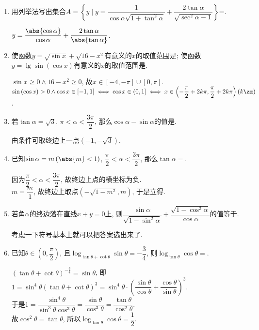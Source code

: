 \begin{enumerate}
\item 用列举法写出集合$A=\left\{y\mid y=\dfrac{1}{\cos\alpha\sqrt{1+\tan^2\alpha}}
+\dfrac{2\tan\alpha}{\sqrt{\sec^2\alpha-1}}\right\}$=.
\begin{jieda}
$y=\dfrac{\abs{\cos\alpha}}{\cos\alpha}+\dfrac{2\tan\alpha}{\abs{\tan\alpha}}$. 
\end{jieda}


\item 使函数$y=\sqrt{\sin{x}}+\sqrt{16-x^2}$有意义的$x$的取值范围是\blkda[3]{$[-4,-\pi]\cup[0,\pi]$}; 
使函数$y=\lg\sin\left(\cos{x}\right)$有意义的$x$的取值范围是. 
\begin{jieda}
$\sin{x}\geq 0\land 16-x^2\geq 0$, 故$x\in[-4,-\pi]\cup[0,\pi]$. \\
$\sin\left(\cos{x}\right)>0\land\cos{x}\in[-1,1]\iff\cos{x}\in\left(0,1\right]\iff x\in\left(-\dfrac{\pi}{2}+2k\pi,\dfrac{\pi}{2}+2k\pi\right)\left(k\zz\right)$. 
\end{jieda}


\item 若$\tan\alpha=\sqrt3$, $\pi<\alpha<\dfrac{3\pi}{2}$, 那么$\cos\alpha-\sin\alpha$的值是.
\begin{jieda}
由条件可取终边上一点$\left(-1,-\sqrt{3}\right)$. 
\end{jieda}


\item 已知$\sin\alpha=m\left(\abs{m}<1\right)$, $\dfrac{\pi}{2}<\alpha<\dfrac{3\pi}{2}$, 那么$\tan\alpha=$.
\begin{jieda}
因为$\dfrac{\pi}{2}<\alpha<\dfrac{3\pi}{2}$, 故终边上点的横坐标为负. \\
$m=\dfrac{m}{1}$, 故终边上取点$\left(-\sqrt{1-m^2},m\right)$, 于是立得. 
\end{jieda}


\item 若角$\alpha$的终边落在直线$x+y=0$上, 则$\dfrac{\sin\alpha}{\sqrt{1-\sin^2\alpha}}+\dfrac{\sqrt{1-\cos^2\alpha}}{\cos\alpha}$的值等于.
\begin{jieda}
考虑一下符号基本上就可以把答案选出来了. 
\end{jieda}


\item 已知$\theta\in\left(0,\dfrac{\pi}{2}\right)$, 且$\log_{\tan\theta+\cot\theta}\sin\theta=-\dfrac{3}{4}$, 
则$\log_{\tan\theta}\cos\theta=$.
\begin{jieda}
$\left(\tan\theta+\cot\theta\right)^{-\frac{3}{4}}=\sin\theta$, 
即$1=\sin^4\theta\left(\tan\theta+\cot\theta\right)^3=\sin^4\theta\cdot\left(\dfrac{\sin\theta}{\cos\theta}+\dfrac{\cos\theta}{\sin\theta}\right)^3$. \\
于是$1=\dfrac{\sin^4\theta}{\sin^3\theta\cos^3\theta}=\dfrac{\sin\theta}{\cos^3\theta}=\dfrac{\tan\theta}{\cos^2\theta}$. \\
故$\cos^2\theta=\tan\theta$, 所以$\log_{\tan\theta}\cos\theta=\dfrac{1}{2}$. 
\end{jieda}




\end{enumerate}

